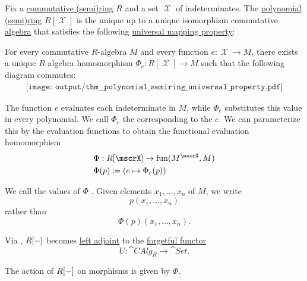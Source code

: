 \begin{theorem}\label{thm:polynomial_semiring_universal_property}
  Fix a \hyperref[def:semiring/commutative]{commutative (semi)ring} \( R \) and a set \( \mscrX \) of indeterminates. The \hyperref[def:polynomial_semiring]{polynomial (semi)ring} \( R[\mscrX] \) is the unique up to a unique isomorphism commutative \hyperref[def:algebra_over_semiring]{algebra} that satisfies the following \hyperref[rem:universal_mapping_property]{universal mapping property}:
  \begin{displayquote}
    For every commutative \( R \)-algebra \( M \) and every function \( e: \mscrX \to M \), there exists a unique \( R \)-algebra homomorphism \( \Phi_e: R[\mscrX] \to M \) such that the following diagram commutes:
    \begin{equation}\label{eq:thm:free_semimodule_universal_property/diagram}
      \begin{aligned}
        \texttt{[image: output/thm\_\_polynomial\_semiring\_universal\_property.pdf]}
      \end{aligned}
    \end{equation}
  \end{displayquote}

  The function \( e \) evaluates each indeterminate in \( M \), while \( \Phi_e \) substitutes this value in every polynomial. We call \( \Phi_e \) the  corresponding to the  \( e \). We can parameterize this by the evaluation functions to obtain the functional evaluation homomorphism
  \begin{equation*}
    \begin{aligned}
      &\Phi: R[\mscrX] \to \fun(M^\mscrX, M) \\
      &\Phi(p) \coloneqq (e \mapsto \Phi_e(p))
    \end{aligned}
  \end{equation*}

  We call the values of \( \Phi \) . Given elements \( x_1, \ldots, x_n \) of \( M \), we write
  \begin{equation*}
    p(x_1, \ldots, x_n)
  \end{equation*}
  rather than
  \begin{equation*}
    \Phi(p)(x_1, \ldots, x_n).
  \end{equation*}

  Via , \( R[\anon*] \) becomes \hyperref[def:category_adjunction]{left adjoint} to the \hyperref[def:concrete_category]{forgetful functor}
  \begin{equation*}
    U: \cat{CAlg}_R \to \cat{Set}.
  \end{equation*}

  The action of \( R[\anon*] \) on morphisms is given by \( \Phi \).
\end{theorem}
